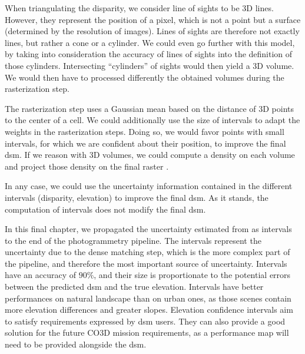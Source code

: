 When triangulating the disparity, we consider line of sights to be 3D lines. However, they represent the position of a pixel, which is not a point but a surface (determined by the resolution of images). Lines of sights are therefore not exactly lines, but rather a cone or a cylinder.  We could even go further with this model, by taking into consideration the accuracy of lines of sights into the definition of those cylinders. Intersecting ``cylinders'' of sights would then yield a 3D volume. We would then have to processed differently the obtained volumes during the rasterization step. 

The rasterization step uses a Gaussian mean based on the distance of 3D points to the center of a cell. We could additionally use the size of intervals to adapt the weights in the rasterization steps. Doing so, we would favor points with small intervals, \ie for which we are confident about their position, to improve the final \acrshort{dsm}. If we reason with 3D volumes, we could compute a density on each volume and project those density on the final raster \etc{}. 

In any case, we could use the uncertainty information contained in the different intervals (disparity, elevation) to improve the final \acrshort{dsm}. As it stands, the computation of intervals does not modify the final \acrshort{dsm}.

In this final chapter, we propagated the uncertainty estimated from  as intervals to the end of the photogrammetry pipeline. The intervals represent the uncertainty due to the dense matching step, which is the more complex part of the pipeline, and therefore the most important source of uncertainty. Intervals have an accuracy of $90\%$, and their size is proportionate to the potential errors between the predicted \acrshort{dsm} and the true elevation. Intervals have better performances on natural landscape than on urban ones, as those scenes contain more elevation differences and greater slopes. Elevation confidence intervals aim to satisfy requirements expressed by \acrshort{dsm} users. They can also provide a good solution for the future CO3D mission requirements, as a performance map will need to be provided alongside the \acrshort{dsm}.

\pagebreak
\blankpage